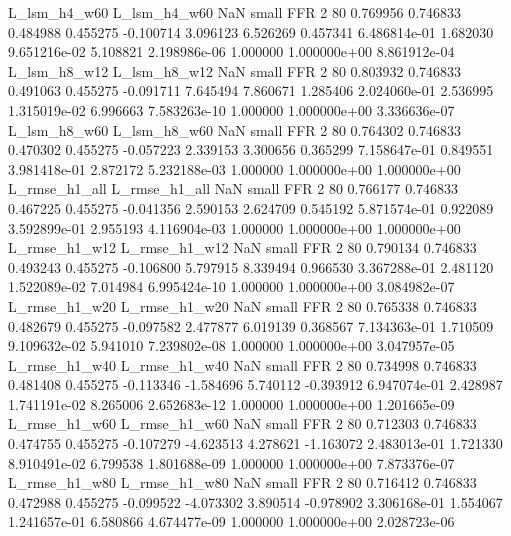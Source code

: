   L_lsm_h4_w60   L_lsm_h4_w60                   NaN      small      FFR                 2 80 0.769956       0.746833 0.484988       0.455275   -0.100714      3.096123      6.526269     0.457341   6.486814e-01  1.682030 9.651216e-02     5.108821   2.198986e-06            1.000000    1.000000e+00        8.861912e-04
  L_lsm_h8_w12   L_lsm_h8_w12                   NaN      small      FFR                 2 80 0.803932       0.746833 0.491063       0.455275   -0.091711      7.645494      7.860671     1.285406   2.024060e-01  2.536995 1.315019e-02     6.996663   7.583263e-10            1.000000    1.000000e+00        3.336636e-07
  L_lsm_h8_w60   L_lsm_h8_w60                   NaN      small      FFR                 2 80 0.764302       0.746833 0.470302       0.455275   -0.057223      2.339153      3.300656     0.365299   7.158647e-01  0.849551 3.981418e-01     2.872172   5.232188e-03            1.000000    1.000000e+00        1.000000e+00
 L_rmse_h1_all  L_rmse_h1_all                   NaN      small      FFR                 2 80 0.766177       0.746833 0.467225       0.455275   -0.041356      2.590153      2.624709     0.545192   5.871574e-01  0.922089 3.592899e-01     2.955193   4.116904e-03            1.000000    1.000000e+00        1.000000e+00
 L_rmse_h1_w12  L_rmse_h1_w12                   NaN      small      FFR                 2 80 0.790134       0.746833 0.493243       0.455275   -0.106800      5.797915      8.339494     0.966530   3.367288e-01  2.481120 1.522089e-02     7.014984   6.995424e-10            1.000000    1.000000e+00        3.084982e-07
 L_rmse_h1_w20  L_rmse_h1_w20                   NaN      small      FFR                 2 80 0.765338       0.746833 0.482679       0.455275   -0.097582      2.477877      6.019139     0.368567   7.134363e-01  1.710509 9.109632e-02     5.941010   7.239802e-08            1.000000    1.000000e+00        3.047957e-05
 L_rmse_h1_w40  L_rmse_h1_w40                   NaN      small      FFR                 2 80 0.734998       0.746833 0.481408       0.455275   -0.113346     -1.584696      5.740112    -0.393912   6.947074e-01  2.428987 1.741191e-02     8.265006   2.652683e-12            1.000000    1.000000e+00        1.201665e-09
 L_rmse_h1_w60  L_rmse_h1_w60                   NaN      small      FFR                 2 80 0.712303       0.746833 0.474755       0.455275   -0.107279     -4.623513      4.278621    -1.163072   2.483013e-01  1.721330 8.910491e-02     6.799538   1.801688e-09            1.000000    1.000000e+00        7.873376e-07
 L_rmse_h1_w80  L_rmse_h1_w80                   NaN      small      FFR                 2 80 0.716412       0.746833 0.472988       0.455275   -0.099522     -4.073302      3.890514    -0.978902   3.306168e-01  1.554067 1.241657e-01     6.580866   4.674477e-09            1.000000    1.000000e+00        2.028723e-06
